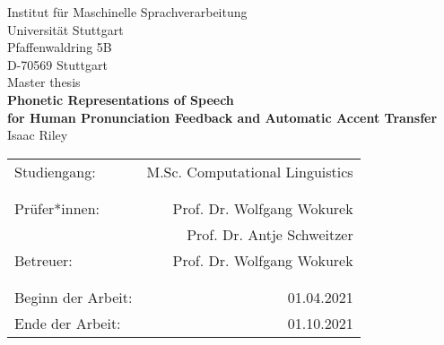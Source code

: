 \documentclass[12pt,leqno,a4paper]{article}
\newcommand{\Titel}{Phonetic Representations of Speech\\ 
for Human Pronunciation Feedback and Automatic Accent Transfer}
\begin{document}

\begin{titlepage}
  \large
   \begin{center}
    Institut für Maschinelle Sprachverarbeitung\\
    Universität Stuttgart\\
    Pfaffenwaldring 5B\\
    D-70569 Stuttgart\\    
    
    \vspace{2.5cm}
    Master thesis\\
    {\LARGE \bf \Titel} \\
    \vspace{2cm}
    Isaac Riley\\
       \vfill
    \begin{tabular}[t]{lr}
    Studiengang: & M.Sc. Computational Linguistics \\ %
    \\
    \\
    {Prüfer*innen:} & Prof. Dr. Wolfgang Wokurek\\
     & Prof. Dr. Antje Schweitzer\\
    {Betreuer:} & Prof. Dr. Wolfgang Wokurek\\ 
    \\
    \\
    {Beginn der Arbeit:} & 01.04.2021\\
    {Ende der Arbeit:} & 01.10.2021\\
    \end{tabular}
  \end{center}
\setlength{\hoffset}{0cm}

  \normalsize
\end{titlepage}


\newpage
\thispagestyle{empty}
\end{document}
